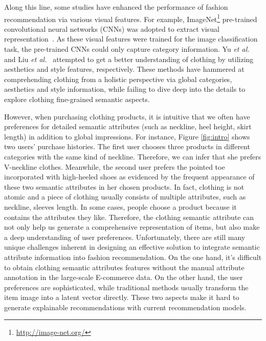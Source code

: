 \documentclass{article}
\begin{document}
Along this line, some studies have enhanced the performance of fashion recommendation via various visual features. For example, ImageNet\footnote{\url{http://image-net.org/}} pre-trained convolutional neural networks (CNNs) was adopted to extract visual representation~\cite{mcauley2015image,he2016vbpr,he2016sherlock}. As these visual features were trained for the image classification task, the pre-trained CNNs could only capture category information. Yu \textit{et al.}~ and Liu \textit{et al.}~ attempted to get a better understanding of clothing by utilizing aesthetics and style features, respectively. 
These methods have hammered at comprehending clothing from a holistic perspective via global categories, aesthetics and style information, while failing to dive deep into the details to explore clothing fine-grained semantic aspects. 

However, when purchasing clothing products, it is intuitive that we often have preferences for detailed semantic attributes (such as neckline, heel height, skirt length) in addition to global impressions. For instance, Figure \ref{fig:intro} shows two users' purchase histories. The first user chooses three products in different categories with the same kind of neckline. Therefore, we can infer that she prefers V-neckline clothes. Meanwhile, the second user prefers the pointed toe incorporated with high-heeled shoes as evidenced by the frequent appearance of these two semantic attributes in her chosen products. In fact, clothing is not atomic and a piece of clothing usually consists of multiple attributes, such as neckline, sleeves length. In some cases, people choose a product because it contains the attributes they like. Therefore, the clothing semantic attribute can not only help us generate a comprehensive representation of items, but also make a deep understanding of user preferences. Unfortunately, there are still many unique challenges inherent in designing an effective solution to integrate semantic attribute information into fashion recommendation. On the one hand, it's difficult to obtain clothing semantic attributes features without the manual attribute annotation in the large-scale E-commerce data. On the other hand, the user preferences are sophisticated, while traditional methods usually transform the item image into a latent vector directly. These two aspects make it hard to generate explainable recommendations with current recommendation models.
\end{document}
